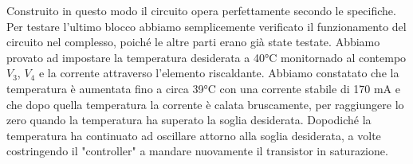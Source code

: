 Construito in questo modo il circuito opera perfettamente secondo le specifiche. Per testare l'ultimo blocco abbiamo semplicemente
verificato il funzionamento del circuito nel complesso, poiché le altre parti erano già state testate. Abbiamo provato ad impostare
la temperatura desiderata a 40\si{\celsius} monitornado al contempo $V_3$, $V_4$ e la corrente attraverso l'elemento riscaldante.
Abbiamo constatato che la temperatura è aumentata fino a circa 39\si{\celsius} con una corrente stabile di 170 mA e che dopo quella temperatura
la corrente è calata bruscamente, per raggiungere lo zero quando la temperatura ha superato la soglia desiderata. Dopodiché
la temperatura ha continuato ad oscillare attorno alla soglia desiderata, a volte costringendo il "controller" a mandare nuovamente il
transistor in saturazione.